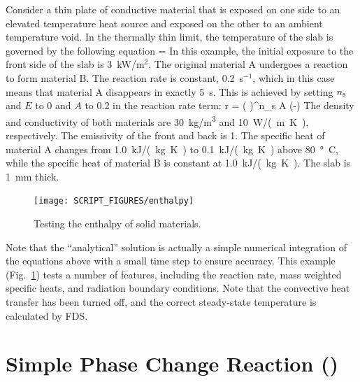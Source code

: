 \documentclass[11pt]{book}
\begin{document}
Consider a thin plate of conductive material that is exposed on one side to an elevated temperature heat source and exposed on the other to an ambient temperature void. In the thermally thin limit, the temperature of the slab is governed by the following equation
\be
    = 
\ee
In this example, the initial exposure to the front side of the slab is 3~kW/m$^2$. The original material A undergoes a reaction to form material B.  The reaction rate is constant, 0.2~s$^{-1}$, which in this case means that material A disappears in exactly 5~s. This is achieved by setting $n_{\rm s}$ and $E$ to 0 and $A$ to 0.2 in the reaction rate term:
\be
    r = \left( \right)^{n_{s}}
    A \; \exp \left(-\right)
\ee
The density and conductivity of both materials are 30~\si{kg/m^3} and 10~\si{W/(m.K)}, respectively. The emissivity of the front and back is 1.  The specific heat of material A changes from 1.0~\si{kJ/(kg.K)} to 0.1~\si{kJ/(kg.K)} above 80~\si{\degree C}, while the specific heat of material B is constant at 1.0~\si{kJ/(kg.K)}. The slab is 1~mm thick.
\begin{figure}[!htb]
\centering
\texttt{[image: SCRIPT\_FIGURES/enthalpy]}
\caption[The  test case]{Testing the enthalpy of solid materials.}
\label{fig:solid_phase_enthalpy}
\end{figure}
Note that the ``analytical'' solution is actually a simple numerical integration of the equations above with a small time step to ensure accuracy.
This example (Fig.~\ref{fig:solid_phase_enthalpy}) tests a number of features, including the reaction rate, mass weighted specific heats, and radiation boundary conditions. Note that the
convective heat transfer has been turned off, and the correct steady-state temperature is calculated by FDS.




\section{Simple Phase Change Reaction (\texorpdfstring{}{pcm\_slab})}
\end{document}
